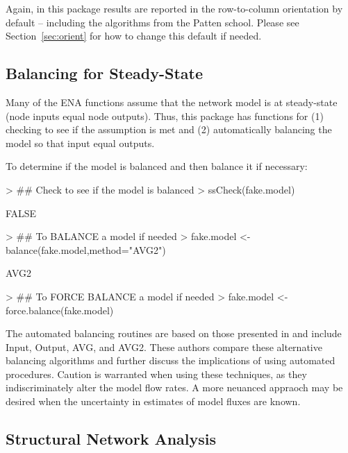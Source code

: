 \documentclass[article]{jss}
\begin{document}
Again, in this package results are reported in the row-to-column
orientation by default -- including the algorithms from the Patten
school.  Please see Section~\ref{sec:orient} for how to change this
default if needed.

\subsection{Balancing for Steady-State}

Many of the ENA functions assume that the network model is at
steady-state (node inputs equal node outputs).  Thus, this package has
functions for (1) checking to see if the assumption is met and (2)
automatically balancing the model so that input equal outputs.

To determine if the model is balanced and then balance it if necessary:

\begin{Schunk}
\begin{Sinput}
> ## Check to see if the model is balanced
> ssCheck(fake.model)
\end{Sinput}
\begin{Soutput}
[1] FALSE
\end{Soutput}
\begin{Sinput}
> ## To BALANCE a model if needed
> fake.model <- balance(fake.model,method="AVG2")
\end{Sinput}
\begin{Soutput}
[1] AVG2
\end{Soutput}
\begin{Sinput}
> ## To FORCE BALANCE a model if needed
> fake.model <- force.balance(fake.model)
\end{Sinput}
\end{Schunk}

The automated balancing routines are based on those presented in
\citet{allesina03} and include Input, Output, AVG, and AVG2.  These authors compare these alternative balancing algorithms and further discuss the implications of using automated
procedures.  Caution is warranted when using these techniques, as they
indiscriminately alter the model flow rates.  A more neuanced appraoch may be desired when the uncertainty in estimates of model fluxes are known.

\subsection{Structural Network Analysis}
\end{document}
